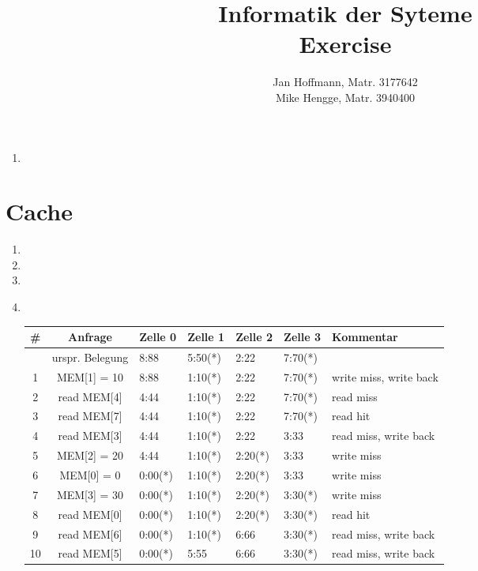 \documentclass[10pt,a4paper]{article}
\title{Informatik der Syteme \\ Exercise \exnum}
\author{Jan Hoffmann, Matr. 3177642 \\ Mike Hengge,  Matr. 3940400}
\begin{document}
\section{}\label{sec:10.1}
	\begin{enumerate}
		\item
	\end{enumerate}

\section{Cache}\label{sec:10.2}
	\begin{enumerate}
		\item
		\item
		\item
		\item \text{}\\
			\begin{tabular}{cc|lllll}
				\# & Anfrage         & Zelle 0 & Zelle 1 & Zelle 2 & Zelle 3 & Kommentar              \\ \hline
				   & urspr. Belegung & 8:88    & 5:50(*) & 2:22    & 7:70(*) &                        \\
				 1 & MEM[1] = 10     & 8:88    & 1:10(*) & 2:22    & 7:70(*) & write miss, write back \\
				 2 & read MEM[4]     & 4:44    & 1:10(*) & 2:22    & 7:70(*) & read miss              \\
				 3 & read MEM[7]     & 4:44    & 1:10(*) & 2:22    & 7:70(*) & read hit                       \\ 
				 4 & read MEM[3]     & 4:44    & 1:10(*) & 2:22    & 3:33    & read miss, write back  \\ 
				 5 & MEM[2] = 20     & 4:44    & 1:10(*) & 2:20(*) & 3:33    & write miss             \\
				 6 & MEM[0] = 0      & 0:00(*) & 1:10(*) & 2:20(*) & 3:33    & write miss             \\ 
				 7 & MEM[3] = 30     & 0:00(*) & 1:10(*) & 2:20(*) & 3:30(*) & write miss             \\ 
				 8 & read MEM[0]     & 0:00(*) & 1:10(*) & 2:20(*) & 3:30(*) & read hit               \\ 
				 9 & read MEM[6]     & 0:00(*) & 1:10(*) & 6:66    & 3:30(*) & read miss, write back  \\ 
				10 & read MEM[5]     & 0:00(*) & 5:55    & 6:66    & 3:30(*) & read miss, write back  \\ 
			\end{tabular}
	\end{enumerate}
			
\end{document}
